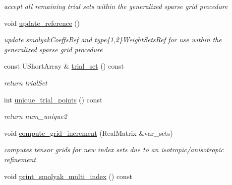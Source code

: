 \begin{DoxyCompactItemize}
\begin{DoxyCompactList}\small\item\em accept all remaining trial sets within the generalized sparse grid procedure \end{DoxyCompactList}\item 
void \hyperlink{classPecos_1_1CombinedSparseGridDriver_a7b4ed98b79fff649e6f66629f8356542}{update\+\_\+reference} ()\label{classPecos_1_1CombinedSparseGridDriver_a7b4ed98b79fff649e6f66629f8356542}

\begin{DoxyCompactList}\small\item\em update smolyak\+Coeffs\+Ref and type\{1,2\}Weight\+Sets\+Ref for use within the generalized sparse grid procedure \end{DoxyCompactList}\item 
const U\+Short\+Array \& \hyperlink{classPecos_1_1CombinedSparseGridDriver_a5c92e49dbfbcfa5b0d1523ed254b4d76}{trial\+\_\+set} () const \label{classPecos_1_1CombinedSparseGridDriver_a5c92e49dbfbcfa5b0d1523ed254b4d76}

\begin{DoxyCompactList}\small\item\em return trial\+Set \end{DoxyCompactList}\item 
int \hyperlink{classPecos_1_1CombinedSparseGridDriver_a3d8e458c7cf95eae26aa53a738844d89}{unique\+\_\+trial\+\_\+points} () const \label{classPecos_1_1CombinedSparseGridDriver_a3d8e458c7cf95eae26aa53a738844d89}

\begin{DoxyCompactList}\small\item\em return num\+\_\+unique2 \end{DoxyCompactList}\item 
void \hyperlink{classPecos_1_1CombinedSparseGridDriver_af2bf445b9a8d1f418dc3519a3305b05f}{compute\+\_\+grid\+\_\+increment} (Real\+Matrix \&var\+\_\+sets)\label{classPecos_1_1CombinedSparseGridDriver_af2bf445b9a8d1f418dc3519a3305b05f}

\begin{DoxyCompactList}\small\item\em computes tensor grids for new index sets due to an isotropic/anisotropic refinement \end{DoxyCompactList}\item 
void \hyperlink{classPecos_1_1CombinedSparseGridDriver_ae5bcc14a0e7bb726d5280c3dd10e6c98}{print\+\_\+smolyak\+\_\+multi\+\_\+index} () const \label{classPecos_1_1CombinedSparseGridDriver_ae5bcc14a0e7bb726d5280c3dd10e6c98}


\end{DoxyCompactItemize}
